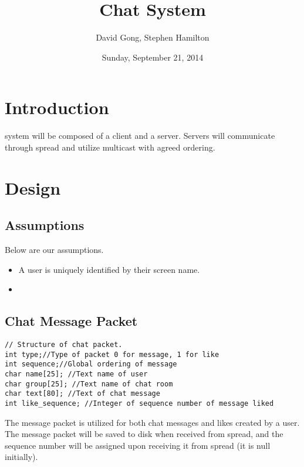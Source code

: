\documentclass[12pt,journal,compsoc]{IEEEtran}
\begin{document}
\title{Chat System}
\author{David Gong, Stephen Hamilton}%
\date{Sunday, September 21, 2014}
\maketitle
\section{Introduction}
 system will be composed of a client and a server.  Servers will communicate through spread and utilize multicast with agreed ordering.  
\section{Design}
\subsection{Assumptions}
Below are our assumptions.
\begin{itemize}
\item A user is uniquely identified by their screen name.
\item 
\end{itemize}
\subsection{Chat Message Packet}
\begin{lstlisting}
// Structure of chat packet.
int type;//Type of packet 0 for message, 1 for like
int sequence;//Global ordering of message
char name[25]; //Text name of user
char group[25]; //Text name of chat room
char text[80]; //Text of chat message
int like_sequence; //Integer of sequence number of message liked
\end{lstlisting}
The message packet is utilized for both chat messages and likes created by a user.  The message packet will be saved to disk when received from spread, and the sequence number will be assigned upon receiving it from spread (it is null initially).
\end{document}
